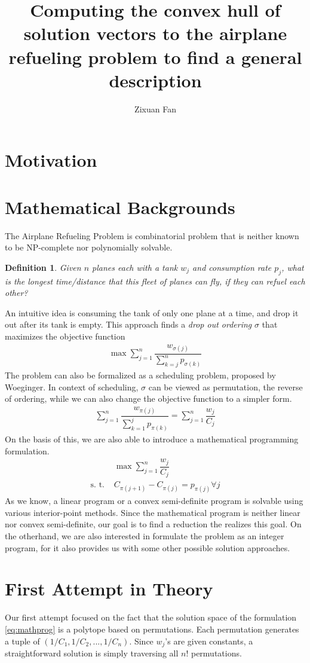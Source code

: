 \documentclass[12pt,letterpaper]{article}
\title{Computing the convex hull of solution vectors to the airplane refueling problem to find a general description}
\author{Zixuan Fan}
\newtheorem{definition}[theorem]{Definition}
\begin{document}
\section{Motivation}

\section{Mathematical Backgrounds}
The Airplane Refueling Problem is combinatorial problem that is 
neither known to be NP-complete nor polynomially solvable. 
\begin{definition}
    Given $n$ planes each with a tank $w_j$ and consumption rate $p_j$,
    what is the longest time/distance that this fleet of planes can fly,
    if they can refuel each other?
\end{definition}
An intuitive idea is consuming the tank of only one plane 
at a time, and drop it out after its tank is empty. This approach 
finds a \textit{drop out ordering} $\sigma$
that maximizes the objective function 
\begin{align*}
    \max \sum_{j=1}^{n} \dfrac{w_{\sigma(j)}}{\sum_{k = j}^n p_{\sigma(k)}}
\end{align*}
The problem can also be formalized as a scheduling problem, proposed by Woeginger. 
In context of scheduling, $\sigma$ can be viewed as permutation, the reverse of ordering, 
while we can also change the objective function to a simpler form. 
\begin{align*}
    \sum_{j = 1}^n \dfrac{w_{\pi(j)}}{\sum_{k = 1}^j p_{\pi(k)}} =  \sum_{j = 1}^n \dfrac{w_{j}}{C_j}
\end{align*}
On the basis of this, we are also able to introduce a mathematical programming formulation.
\begin{align}
    &\max \sum_{j = 1}^n \dfrac{w_j}{C_j} \label{eq:mathprog} \tag{A} \\ 
    \text{s. t.\ }&  C_{\pi(j+1)} - C_{\pi(j)} = p_{\pi(j)} \forall j \nonumber
\end{align}
As we know, a linear program or a convex semi-definite program is solvable using various interior-point methods. 
Since the mathematical program is neither linear nor convex semi-definite, our goal is to find a reduction the 
realizes this goal. On the otherhand, we are also interested in formulate the problem as an integer program, 
for it also provides us with some other possible solution approaches. 

\section{First Attempt in Theory}
Our first attempt focused on the fact that the solution space of the formulation \ref{eq:mathprog}
is a polytope based on permutations. Each permutation generates a tuple of $(1/C_1, 1/C_2, ..., 1/C_n)$.
Since $w_j$'s are given constants, a straightforward solution is simply traversing all $n!$ permutations. 
\end{document}
